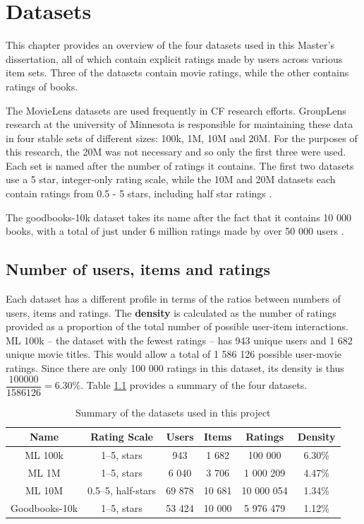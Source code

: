 \chapter{Datasets}
This chapter provides an overview of the four datasets used in this Master's dissertation, all of which contain explicit ratings made by users across various item sets. Three of the datasets contain movie ratings, while the other contains ratings of books.

The MovieLens datasets are used frequently in CF research efforts. GroupLens research at the university of Minnesota is responsible for maintaining these data in four stable sets of different sizes: 100k, 1M, 10M and 20M. For the purposes of this research, the 20M was not necessary and so only the first three were used. Each set is named after the number of ratings it contains. The first two datasets use a 5 star, integer-only rating scale, while the 10M and 20M datasets each contain ratings from 0.5 - 5 stars, including half star ratings \parencite{harper2016movielens}.

The goodbooks-10k dataset takes its name after the fact that it contains 10 000 books, with a total of just under 6 million ratings made by over 50 000 users \parencite{goodbooks2017}.

\section{Number of users, items and ratings}
Each dataset has a different profile in terms of the ratios between numbers of users, items and ratings. The \textbf{density} is calculated as the number of ratings provided as a proportion of the total number of possible user-item interactions. ML 100k -- the dataset with the fewest ratings -- has 943 unique users and 1 682 unique movie titles. This would allow a total of 1 586 126 possible user-movie ratings. Since there are only 100 000 ratings in this dataset, its density is thus $\dfrac{100000}{1586126} = 6.30\%$. Table \ref{tab:data-summary} provides a summary of the four datasets.

\begin{table}[H]
\centering
\begin{tabular}{c | c | c | c | c | c}
\toprule
\textbf{Name} & \textbf{Rating Scale} & \textbf{Users} & \textbf{Items} & \textbf{Ratings} & \textbf{Density} \\
\midrule
ML 100k & 1--5, stars & 943 & 1 682 & 100 000 & 6.30\% \\
ML 1M & 1--5, stars & 6 040 & 3 706 & 1 000 209 & 4.47\% \\
ML 10M & 0.5--5, half-stars & 69 878 & 10 681 & 10 000 054 & 1.34\% \\
Goodbooks-10k & 1--5, stars & 53 424 & 10 000 & 5 976 479 & 1.12\% \\
\bottomrule
\end{tabular}
\caption[Data summary]{Summary of the datasets used in this project}
\label{tab:data-summary}
\end{table}

